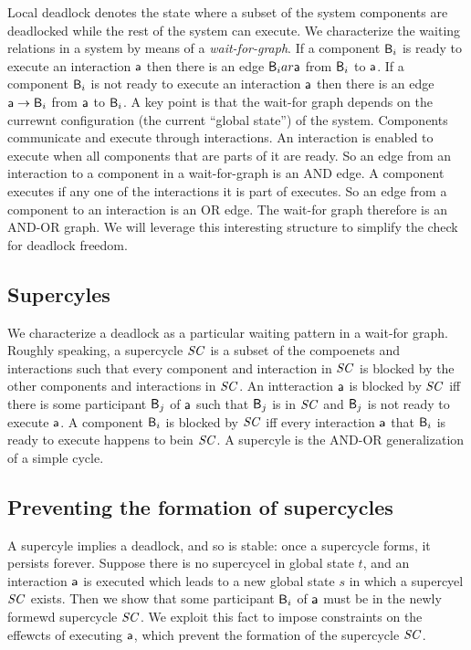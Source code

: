 Local deadlock denotes the state where a subset of the system components are deadlocked while the rest of the system can execute.
%
We characterize the waiting relations in a system by means of a {\em wait-for-graph}. 
If a component $\mathsf{B}_i$ is ready to execute an interaction $\mathsf{a}$ then there is an edge $\mathsf{B}_i ar \mathsf{a}$ from $\mathsf{B}_i$ to $\mathsf{a}$.
If a component $\mathsf{B}_i$ is not ready to execute an interaction $\mathsf{a}$ then there is an edge $\mathsf{a} \rightarrow \mathsf{B}_i$ from $\mathsf{a}$ to $\mathsf{B}_i$.
A key point is that the wait-for graph depends on the currewnt configuration (\ie the current ``global state'') of the system.
%
Components communicate and execute through interactions. 
An interaction is enabled to execute when all components that 
are parts of it are ready. 
So an edge from an interaction to a component in a wait-for-graph
is an AND edge. 
A component executes if any one of the interactions it is part of
executes. So an edge from a component to an interaction is an OR
edge. 
The wait-for graph therefore is an AND-OR graph. 
We will leverage this interesting structure to simplify the
check for deadlock freedom. 



\subsection{Supercyles}

We characterize a deadlock as a particular waiting pattern in a wait-for graph.
Roughly speaking, a supercycle $\mathit{SC}$ is a subset of the compoenets and interactions such that every component and interaction in $\mathit{SC}$ is blocked by
the other components and interactions in $\mathit{SC}$. 
An intteraction $\mathsf{a}$ is blocked by $\mathit{SC}$ iff there is some participant $\mathsf{B}_j$ of $\mathsf{a}$ such that $\mathsf{B}_j$ is in $\mathit{SC}$ and $\mathsf{B}_j$ is not ready to
execute $\mathsf{a}$.
A component $\mathsf{B}_i$ is blocked by $\mathit{SC}$ iff every interaction $\mathsf{a}$ that $\mathsf{B}_i$ is ready to execute happens to bein $\mathit{SC}$.
A supercyle is the AND-OR generalization of a simple cycle.



\subsection{Preventing the formation of supercycles}

A supercyle implies a deadlock, and so is stable: once a supercycle forms, it persists forever.
Suppose there is no supercycel in global state $t$, and an interaction $\mathsf{a}$ is executed which leads to a new global state $s$ in which a supercyel $\mathit{SC}$
exists. 
Then we show that some participant $\mathsf{B}_i$ of $\mathsf{a}$ must be in the newly formewd supercycle $\mathit{SC}$. 
We exploit this fact to impose constraints on the effewcts of executing $\mathsf{a}$, which prevent the formation of the supercycle $\mathit{SC}$.
